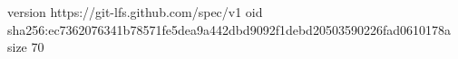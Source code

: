 version https://git-lfs.github.com/spec/v1
oid sha256:ec7362076341b78571fe5dea9a442dbd9092f1debd20503590226fad0610178a
size 70
